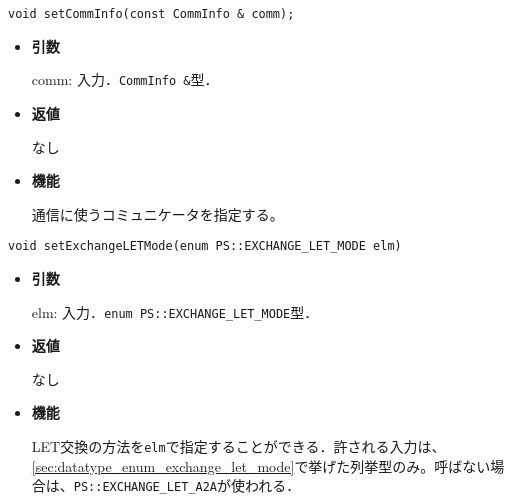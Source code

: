 
\begin{screen}
\begin{verbatim}
void setCommInfo(const CommInfo & comm);
\end{verbatim}
\end{screen}

\begin{itemize}

\item {\bf 引数}

comm: 入力．{\tt CommInfo \&}型．

\item {\bf 返値}

なし

\item {\bf 機能}

通信に使うコミュニケータを指定する。

\end{itemize}



\label{sec:module_standard_treeforce_setexchangeletmode}
\begin{screen}
\begin{verbatim}
void setExchangeLETMode(enum PS::EXCHANGE_LET_MODE elm)
\end{verbatim}
\end{screen}

\begin{itemize}

\item {\bf 引数}

elm: 入力．{\tt enum PS::EXCHANGE\_LET\_MODE}型．

\item {\bf 返値}

なし

\item {\bf 機能}

LET交換の方法を{\tt elm}で指定することができる．許される入力は、
\ref{sec:datatype_enum_exchange_let_mode}で挙げた列挙型のみ。呼ばない場合は、{\tt PS::EXCHANGE\_LET\_A2A}が使われる．

\end{itemize}


